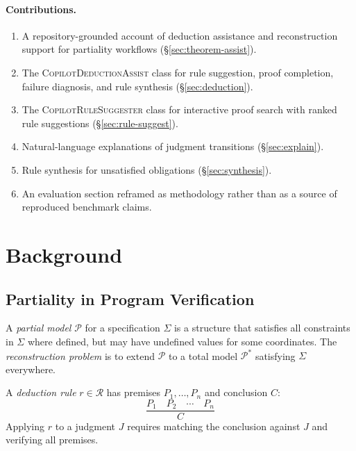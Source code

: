 \documentclass[11pt]{article}
\newcommand{\DeducAssist}{\textsc{CopilotDeductionAssist}}
\newcommand{\RuleSugg}{\textsc{CopilotRuleSuggester}}
\newcommand{\partmodel}{\mathcal{P}}
\newcommand{\rulelib}{\mathcal{R}}
\begin{document}
\paragraph{Contributions.}
\begin{enumerate}[leftmargin=2em]
  \item A repository-grounded account of deduction assistance and
        reconstruction support for partiality workflows
        (§\ref{sec:theorem-assist}).
  \item The \DeducAssist{} class for rule suggestion, proof completion,
        failure diagnosis, and rule synthesis (§\ref{sec:deduction}).
  \item The \RuleSugg{} class for interactive proof search with ranked
        rule suggestions (§\ref{sec:rule-suggest}).
  \item Natural-language explanations of judgment transitions
        (§\ref{sec:explain}).
  \item Rule synthesis for unsatisfied obligations (§\ref{sec:synthesis}).
  \item An evaluation section reframed as methodology rather than as a
        source of reproduced benchmark claims.
\end{enumerate}

\section{Background}\label{sec:bg}

\subsection{Partiality in Program Verification}

\begin{definition}\label{def:partial}
A \emph{partial model} $\partmodel$ for a specification $\Sigma$ is a
structure that satisfies all constraints in $\Sigma$ where defined, but may
have undefined values for some coordinates.  The \emph{reconstruction problem}
is to extend $\partmodel$ to a total model $\partmodel^*$ satisfying $\Sigma$
everywhere.
\end{definition}

\begin{definition}\label{def:deduction-rule}
A \emph{deduction rule} $r \in \rulelib$ has premises $P_1, \ldots, P_n$ and
conclusion $C$:
\[
  \frac{P_1 \quad P_2 \quad \cdots \quad P_n}{C}
\]
Applying $r$ to a judgment $J$ requires matching the conclusion against $J$
and verifying all premises.
\end{definition}
\end{document}
